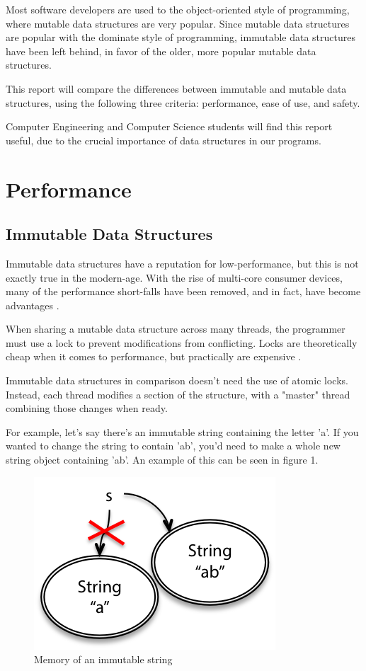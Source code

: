 \documentclass[11pt]{article}
\begin{document}
Most software developers are used to the object-oriented style of programming,
where mutable data structures are very popular. Since mutable data structures
are popular with the dominate style of programming, immutable data structures
have been left behind, in favor of the older, more popular mutable data
structures.

This report will compare the differences between immutable and mutable data
structures, using the following three criteria: performance, ease of use, and
safety.

Computer Engineering and Computer Science students will find this report useful,
due to the crucial importance of data structures in our programs.
\clearpage

\section{Performance}
\subsection{Immutable Data Structures}
Immutable data structures have a reputation for low-performance, but this is not
exactly true in the modern-age. With the rise of multi-core consumer devices,
many of the performance short-falls have been removed, and in fact, have become
advantages \cite{slaks}.

When sharing a mutable data structure across many threads, the programmer must
use a lock to prevent modifications from conflicting. Locks are theoretically
cheap when it comes to performance, but practically are expensive
\cite{attractive_chaos}.

Immutable data structures in comparison doesn't need the use of atomic locks.
Instead, each thread modifies a section of the structure, with a "master"
thread combining those changes when ready.

For example, let's say there's an immutable string containing the letter 'a'.
If you wanted to change the string to contain 'ab', you'd need to make a whole
new string object containing 'ab'. An example of this can be seen in figure 1.

\begin{figure}[H]
\centering

\includegraphics{immutable_string}
\caption{Memory of an immutable string \cite{mit_reading_9}}

\end{figure}
\end{document}
